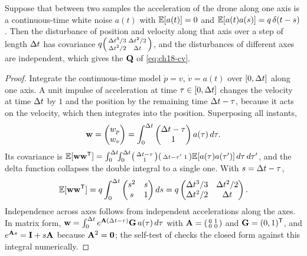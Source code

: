 \begin{proposition}
\label{thm:ch18-cv-q}
Suppose that between two samples the acceleration of the drone along one axis
is a continuous-time white noise $a(t)$ with $\mathbb{E}[a(t)]=0$ and
$\mathbb{E}[a(t)a(s)]=q\,\delta(t-s)$. Then the disturbance of position and velocity
along that axis over a step of length $\Delta t$ has covariance
$q\begin{psmallmatrix}\Delta t^3/3&\Delta t^2/2\\ \Delta t^2/2&\Delta t\end{psmallmatrix}$, and
the disturbances of different axes are independent, which gives the $\mathbf{Q}$
of \cref{eq:ch18-cv}.
\end{proposition}
\begin{proof}
Integrate the continuous-time model $\dot p=v$, $\dot v=a(t)$ over $[0,\Delta t]$
along one axis. A unit impulse of acceleration at time $\tau\in[0,\Delta t]$ changes
the velocity at time $\Delta t$ by $1$ and the position by the remaining time
$\Delta t-\tau$, because it acts on the velocity, which then integrates into the
position. Superposing all instants,
\[
  \mathbf{w}=\begin{pmatrix}w_p\\ w_v\end{pmatrix}
  =\int_0^{\Delta t}\begin{pmatrix}\Delta t-\tau\\ 1\end{pmatrix}a(\tau)\,d\tau .
\]
Its covariance is
$\mathbb{E}[\mathbf{w}\mathbf{w}^{\mathsf{T}}]=\int_0^{\Delta t}\!\!\int_0^{\Delta t}
\begin{psmallmatrix}\Delta t-\tau\\1\end{psmallmatrix}
\begin{psmallmatrix}\Delta t-\tau'&1\end{psmallmatrix}\mathbb{E}[a(\tau)a(\tau')]\,d\tau\,d\tau'$,
and the delta function collapses the double integral to a single one. With
$s=\Delta t-\tau$,
\[
  \mathbb{E}[\mathbf{w}\mathbf{w}^{\mathsf{T}}]=q\int_0^{\Delta t}\begin{pmatrix}s^2&s\\ s&1\end{pmatrix}ds
  =q\begin{pmatrix}\Delta t^3/3&\Delta t^2/2\\ \Delta t^2/2&\Delta t\end{pmatrix}.
\]
Independence across axes follows from independent accelerations along the
axes. In matrix form, $\mathbf{w}=\int_0^{\Delta t}e^{\mathbf{A}(\Delta t-\tau)}\mathbf{G}\,a(\tau)\,d\tau$
with $\mathbf{A}=\begin{psmallmatrix}0&1\\0&0\end{psmallmatrix}$ and
$\mathbf{G}=(0,1)^{\mathsf{T}}$, and $e^{\mathbf{A}s}=\mathbf{I}+s\mathbf{A}$ because
$\mathbf{A}^2=\mathbf{0}$; the self-test of  checks the closed
form against this integral numerically.
\end{proof}

